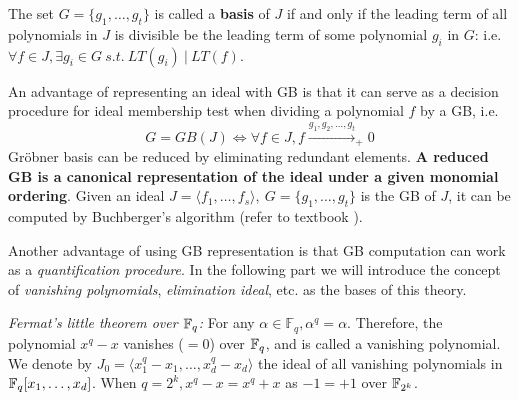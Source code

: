 \begin{definition}
The set $G = \{g_1, \dots,
g_t\}$ is called a \textbf{\Grobner basis} of $J$ if and only if the
leading term of all polynomials in $J$ is divisible be the leading
term of some polynomial $g_i$ in $G$: i.e. $\forall f \in J, \exists
g_i \in G \ s.t. \ LT(g_i) ~|~ LT(f)$. 
\end{definition}

An advantage of representing an ideal with GB is that it can serve as a decision procedure for ideal membership
test when dividing a polynomial $f$ by a GB, i.e.
$$G = GB(J) \Longleftrightarrow \forall f\in J, f\xrightarrow{g_1,g_2,\dots,g_t}_{+} 0$$
Gr\"obner basis can be reduced by eliminating redundant elements. \textbf{A reduced GB is a canonical representation of 
the ideal under a given monomial ordering}. Given an ideal $J = \langle f_1,\dots,f_s\rangle, ~G = 
\{g_1,\dots,g_t\}$ is the GB of $J$, it can be computed by Buchberger's algorithm (refer to textbook \cite{ideal:book}).

Another advantage of using GB representation is that GB computation can work as a {\it quantification procedure}.
In the following part we will introduce the concept of \textit{vanishing polynomials}, \textit{elimination ideal}, etc.
as the bases of this theory.

{\it Fermat's little theorem over ${\mathbb{F}}_{q}$:} For any $ \alpha \in \mathbb
F_{q}, \alpha^q = \alpha$. Therefore, the polynomial $x^q - x$
vanishes ($=0$) over ${\mathbb{F}}_{q}$, and is called a vanishing polynomial. We
denote by $J_0 = \langle x_1^q - x_1, \dots, x_d^q - x_d \rangle$ the
ideal of all vanishing polynomials in ${\mathbb{F}}_{q}[x_1, \dots, x_d]$. When $q
= 2^k, x^q - x = x^q + x$ as $-1 = +1$ over ${\mathbb{F}}_{2^k}$.

